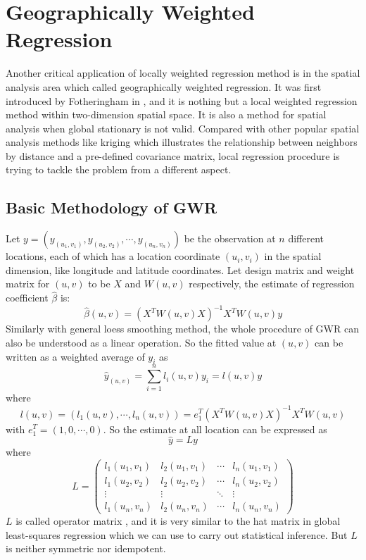 \section{Geographically Weighted Regression}

Another critical application of locally weighted regression method is in the 
spatial analysis area which called geographically weighted regression. It was first
introduced by Fotheringham in \cite{fotheringhamgeographically}, and it is nothing
but a local weighted regression method within two-dimension spatial space. It is
also a method for spatial analysis when global stationary is not valid. Compared 
with other popular spatial analysis
methods like kriging \cite{krige1951statistical} which illustrates the relationship 
between neighbors by distance and a pre-defined covariance matrix, local regression 
procedure is trying to tackle the problem from a different aspect.

\subsection{Basic Methodology of GWR}

Let $y=(y_{(u_1,v_1)}, y_{(u_2,v_2)}, \cdots, y_{(u_n,v_n)})$ be the observation 
at $n$ different locations, each of which has a location coordinate $(u_i, v_i)$ 
in the spatial dimension, like longitude and latitude coordinates. Let design matrix 
and weight matrix for $(u, v)$ to be $X$ and $W(u, v)$ respectively, the estimate 
of regression coefficient $\hat \beta$ is:
\begin{equation}
\hat \beta(u, v) = (X^TW(u,v)X)^{-1}X^TW(u,v)y
\end{equation}
Similarly with general loess smoothing method, the whole procedure of GWR can
also be understood as a linear operation. So the fitted value at $(u, v)$ can 
be written as a weighted average of $y_i$ as
\begin{equation}
\hat y_{(u,v)} = \sum_{i=1}^n l_i(u,v)y_i = l(u,v)y
\end{equation}
where
\begin{equation}
l(u,v) = (l_1(u,v), \cdots, l_n(u,v)) = e_1^T(X^TW(u,v)X)^{-1}X^TW(u,v)
\end{equation}
with $e_1^T = (1,0,\cdots,0)$. So the estimate at all location can be expressed
as
\begin{equation}
\hat y = Ly
\end{equation}
where 
\begin{equation}
L =  
\begin{pmatrix}
  l_1(u_1,v_1) & l_2(u_1,v_1) & \cdots & l_n(u_1,v_1) \\
  l_1(u_2,v_2) & l_2(u_2,v_2) & \cdots & l_n(u_2,v_2) \\
  \vdots  & \vdots & \ddots & \vdots  \\
  l_1(u_n,v_n) & l_2(u_n,v_n) & \cdots & l_n(u_n,v_n) 
\end{pmatrix}
\end{equation}
$L$ is called operator matrix \cite{hafen2010local}, and it is very similar to the
hat matrix in global least-squares regression which we can use to carry out 
statistical inference. But $L$ is neither symmetric nor idempotent.

